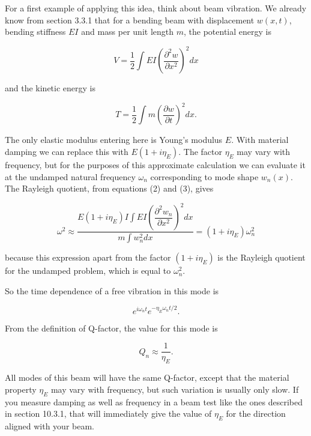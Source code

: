   For a first example of applying this idea, think about beam vibration. We 
  already know from section 3.3.1 that for a bending beam with displacement 
  $w(x,t)$, bending stiffness $EI$ and mass per unit length $m$, the potential 
  energy is 

  \begin{equation*} V = \dfrac{1}{2} \int{EI \left(\dfrac{\partial^2 
  w}{\partial x^2} \right)^2 dx} \tag{2}\end{equation*} 

  \noindent{}and the kinetic energy is 

  \begin{equation*}T=\dfrac{1}{2} \int{ m \left(\dfrac{\partial w}{\partial t} 
  \right)^2 dx } . \tag{3}\end{equation*} 

  The only elastic modulus entering here is Young's modulus $E$. With material 
  damping we can replace this with $E(1+i \eta_E)$. The factor $\eta_E$ may 
  vary with frequency, but for the purposes of this approximate calculation we 
  can evaluate it at the undamped natural frequency $\omega_n$ corresponding to 
  mode shape $w_n(x)$. The Rayleigh quotient, from equations (2) and (3), gives 

  \begin{equation*}\omega^2 \approx \dfrac{E(1+i \eta_E) I \int{EI 
  \left(\dfrac{\partial^2 w_n}{\partial x^2} \right)^2 dx}}{m \int{w_n^2 
  dx}}=(1+i \eta_E) \omega_n^2 \tag{4}\end{equation*} 

  \noindent{}because this expression apart from the factor $(1+i \eta_E)$ is 
  the Rayleigh quotient for the undamped problem, which is equal to 
  $\omega_n^2$. 

  So the time dependence of a free vibration in this mode is 

  \begin{equation*}e^{i \omega_n t} e^{-\eta_E \omega_n t/2} . 
  \tag{5}\end{equation*} 

  From the definition of Q-factor, the value for this mode is 

  \begin{equation*}Q_n \approx \dfrac{1}{\eta_E} . \tag{6}\end{equation*} 

  All modes of this beam will have the same Q-factor, except that the material 
  property $\eta_E$ may vary with frequency, but such variation is usually only 
  slow. If you measure damping as well as frequency in a beam test like the 
  ones described in section 10.3.1, that will immediately give the value of 
  $\eta_E$ for the direction aligned with your beam. 

